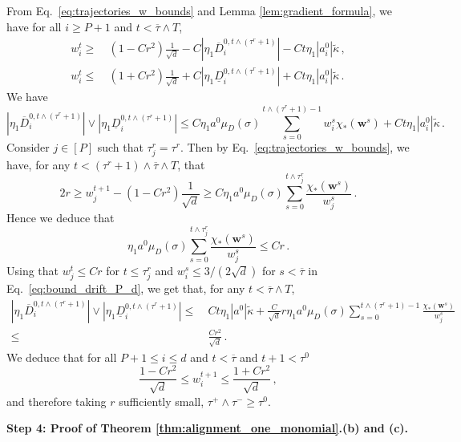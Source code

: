 \documentclass[11pt]{article}
\newcommand{\<}{\langle}
\renewcommand{\>}{\rangle}
\theoremstyle{definition}
\def\bw{{\boldsymbol w}}
\def\bw{{\boldsymbol w}}
\def\uD{\underline{D}}
\def\oD{\overline{D}}
\def\otau{\overline{\tau}}
\def\oD{\overline{D}}
\begin{document}
From Eq.~\eqref{eq:trajectories_w_bounds} and Lemma \ref{lem:gradient_formula}, we have for all $i \geq P+1$ and $t < \otau \wedge T$,
\[
\begin{aligned}
w_i^t \geq&~ (1 - Cr^2) \frac{1}{\sqrt{d}} - C |\eta_1  \oD_i^{0,t \wedge ( \tau^r +1 )}| - Ct \eta_1 |a_i^0| \tilde\kappa \, ,\\
w_i^t \leq &~ (1 + Cr^2) \frac{1}{\sqrt{d}}  + C |\eta_1 \uD_i^{0,t \wedge (\tau^r +1) }| + Ct \eta_1 |a_i^0| \tilde\kappa \, .
\end{aligned}
\]
We have
\begin{equation}\label{eq:bound_drift_P_d}
|\eta_1  \oD_i^{0,t \wedge ( \tau^r +1 )}| \vee |\eta_1  \uD_i^{0,t \wedge ( \tau^r +1 )}| \leq   C \eta_1 a^0 \mu_D (\sigma) \sum_{s=0}^{t \wedge ( \tau^r +1 ) - 1} w_i^s \chi_* (\bw^s ) + C t \eta_1 |a_i^0| \tilde\kappa\, .
\end{equation}
Consider $j \in [P]$ such that $\tau^r_j = \tau^r$. Then by Eq.~\eqref{eq:trajectories_w_bounds}, we have, for any $t < (\tau^r+1) \wedge \otau \wedge T$, that
\[
2r \geq w^{t + 1 }_j - (1 -Cr^2) \frac{1}{\sqrt{d}} \geq C \eta_1 a^0 \mu_D(\sigma) \sum_{s = 0}^{t \wedge \tau_j^r} \frac{\chi_* (\bw^s) }{w_j^s}\, .
\]
Hence we deduce that 
\begin{equation}\label{eq:bound_drift_P_d_2}
\eta_1 a^0 \mu_D(\sigma) \sum_{s = 0}^{t \wedge \tau^r_j} \frac{\chi_* (\bw^s) }{w_j^s} \leq Cr \, .
\end{equation}
Using that $w_j^t\leq Cr$ for $t \leq \tau_j^r$ and $w_i^s \leq 3 /(2 \sqrt{d})$ for $s < \otau$ in Eq.~\eqref{eq:bound_drift_P_d}, we get that, for any $t < \otau \wedge T$,
\[
\begin{aligned}
|\eta_1  \oD_i^{0,t \wedge ( \tau^r +1 )}| \vee |\eta_1  \uD_i^{0,t \wedge ( \tau^r +1 )}| \leq&~  Ct\eta_1|a^0|\tilde{\kappa} + \frac{C}{\sqrt{d}} r \eta_1 a^0 \mu_D (\sigma) \sum_{s=0}^{t \wedge ( \tau^r +1 ) - 1} \frac{ \chi_* (\bw^s ) }{w_j^s} \\
\leq&~  \frac{Cr^2}{\sqrt{d}} \, . 
\end{aligned}
\]
We deduce that for all $P+1 \leq i \leq d$ and $t < \otau$ and $t+1 < \tau^0$
\begin{equation}\label{eq:bound_w_P_d}
    \frac{1 - Cr^2}{\sqrt{d} } \leq w_i^{t+1} \leq \frac{1 + Cr^2}{\sqrt{d}} \, ,
\end{equation}
and therefore taking $r$ sufficiently small, $\tau^+ \wedge \tau^- \geq \tau^0$.

\noindent
\textbf{Step 4: Proof of Theorem \ref{thm:alignment_one_monomial}.(b) and (c).}
\end{document}
